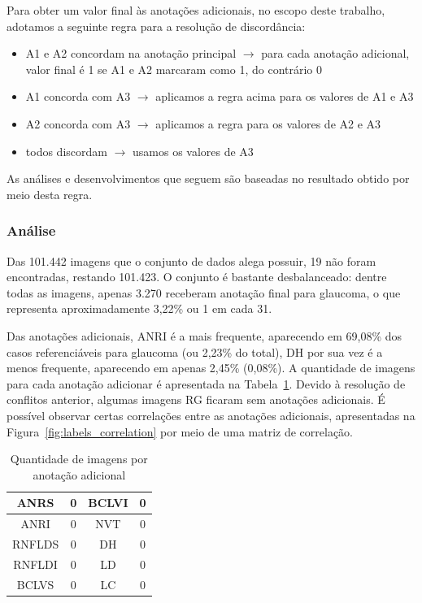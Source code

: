\documentclass[12pt]{article}
\begin{document}
Para obter um valor final às anotações adicionais, no escopo deste trabalho, adotamos a seguinte regra para a resolução de discordância:

\begin{itemize}[noitemsep,topsep=0pt]
    \item A1 e A2 concordam na anotação principal $\rightarrow$ para cada anotação adicional, valor final é 1 se A1 e A2 marcaram como 1, do contrário 0
    \item A1 concorda com A3 $\rightarrow$ aplicamos a regra acima para os valores de A1 e A3
    \item A2 concorda com A3 $\rightarrow$ aplicamos a regra para os valores de A2 e A3
    \item todos discordam $\rightarrow$ usamos os valores de A3
\end{itemize}


As análises e desenvolvimentos que seguem são baseadas no resultado obtido por meio desta regra.

\subsubsection{Análise}
\label{sec:dataset:analysis}
Das 101.442 imagens que o conjunto de dados alega possuir, 19 não foram encontradas, restando 101.423. O conjunto é bastante desbalanceado: dentre todas as imagens, apenas 3.270 receberam anotação final para glaucoma, o que representa aproximadamente 3,22\% ou 1 em cada 31.

Das anotações adicionais, ANRI é a mais frequente, aparecendo em 69,08\% dos casos referenciáveis para glaucoma (ou 2,23\% do total), DH por sua vez é a menos frequente, aparecendo em apenas 2,45\% (0,08\%). A quantidade de imagens para cada anotação adicionar é apresentada na Tabela~\ref{tab:features_count}. Devido à resolução de conflitos anterior, algumas imagens RG ficaram sem anotações adicionais. %
É possível observar certas correlações entre as anotações adicionais, apresentadas na Figura~\ref{fig:labels_correlation} por meio de uma matriz de correlação.

\begin{table}[htb]
    \centering
    \begin{tabular}{|c|c||c|c|}
    \hline
    ANRS & 0 & BCLVI & 0 \\
    \hline
    ANRI & 0 & NVT & 0 \\
    \hline
    RNFLDS & 0 & DH & 0 \\
    \hline
    RNFLDI & 0 & LD & 0 \\
    \hline
    BCLVS & 0 & LC & 0 \\
    \hline
    \end{tabular}
    \caption{Quantidade de imagens por anotação adicional}
    \label{tab:features_count}
\end{table}
\end{document}
